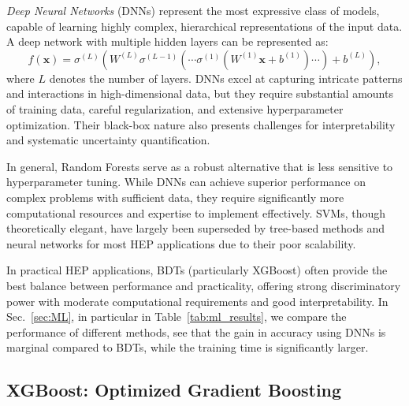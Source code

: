 \textit{Deep Neural Networks} (DNNs) represent the most expressive class of models, capable of learning highly complex, hierarchical representations of the input data. A deep network with multiple hidden layers can be represented as:
\begin{equation}
f(\mathbf{x}) = \sigma^{(L)}\left(W^{(L)} \sigma^{(L-1)}\left( \cdots \sigma^{(1)}(W^{(1)} \mathbf{x} + b^{(1)}) \cdots \right) + b^{(L)}\right),
\end{equation}
where $L$ denotes the number of layers. DNNs excel at capturing intricate patterns and interactions in high-dimensional data, but they require substantial amounts of training data, careful regularization, and extensive hyperparameter optimization. Their black-box nature also presents challenges for interpretability and systematic uncertainty quantification.

In general, Random Forests serve as a robust alternative that is less sensitive to hyperparameter tuning. While DNNs can achieve superior performance on complex problems with sufficient data, they require significantly more computational resources and expertise to implement effectively. SVMs, though theoretically elegant, have largely been superseded by tree-based methods and neural networks for most HEP applications due to their poor scalability.

In practical HEP applications, BDTs (particularly XGBoost) often provide the best balance between performance and practicality, offering strong discriminatory power with moderate computational requirements and good interpretability. In Sec.~\ref{sec:ML}, in particular in Table~\ref{tab:ml_results}, we compare the performance of different methods, see that the gain in accuracy using DNNs is marginal compared to BDTs, while the training time is significantly larger.

\subsection{XGBoost: Optimized Gradient Boosting}
\label{ssec:xgboost}

